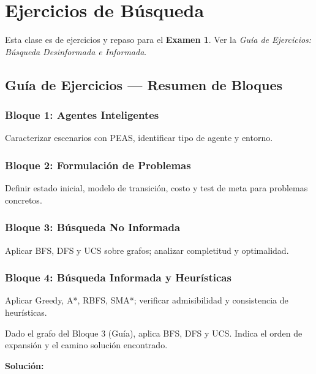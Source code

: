 \section{Ejercicios de Búsqueda}

\begin{remark}
Esta clase es de ejercicios y repaso para el \textbf{Examen 1}.
Ver la \textit{Guía de Ejercicios: Búsqueda Desinformada e Informada}.
\end{remark}

\subsection{Guía de Ejercicios — Resumen de Bloques}

\subsubsection{Bloque 1: Agentes Inteligentes}
Caracterizar escenarios con PEAS, identificar tipo de agente y entorno.

\subsubsection{Bloque 2: Formulación de Problemas}
Definir estado inicial, modelo de transición, costo y test de meta para problemas concretos.

\subsubsection{Bloque 3: Búsqueda No Informada}
Aplicar BFS, DFS y UCS sobre grafos; analizar completitud y optimalidad.

\subsubsection{Bloque 4: Búsqueda Informada y Heurísticas}
Aplicar Greedy, A*, RBFS, SMA*; verificar admisibilidad y consistencia de heurísticas.


\begin{exercise}
Dado el grafo del Bloque 3 (Guía), aplica BFS, DFS y UCS.
Indica el orden de expansión y el camino solución encontrado.

\textbf{Solución:}
\end{exercise}
